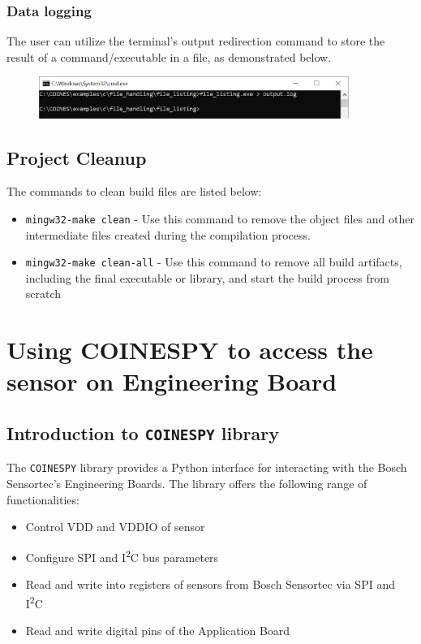 \documentclass[11pt,headings=small]{scrartcl}
\begin{document}
\subsubsection{Data logging}

The user can utilize the terminal's output redirection command to store the result of a command/executable in a file, as demonstrated below.
\begin{figure}[H]
	\begin{center}
		\includegraphics[width=0.9\textwidth]{coinesAPI_images/PC_data_logging.png}
	\end{center}
\end{figure}

\subsection{Project Cleanup}
The commands to clean build files are listed below:
\begin{itemize}
	\item \texttt{mingw32-make clean} - Use this command to remove the object files and other intermediate files created during the compilation process.
	\item \texttt{mingw32-make clean-all} - Use this command to remove all build artifacts, including the final executable or library, and start the build process from scratch
\end{itemize}

\section{Using COINESPY to access the sensor on Engineering Board}

\subsection{Introduction to \texttt{COINESPY} library}

The \texttt{COINESPY} library provides a Python interface for interacting with the Bosch Sensortec's Engineering Boards. 
\newline \newline The library offers the following range of functionalities:
\begin{itemize}
	\item Control VDD and VDDIO of sensor
	\item Configure SPI and I\textsuperscript{2}C bus parameters
	\item Read and write into registers of sensors from Bosch Sensortec via SPI and I\textsuperscript{2}C
	\item Read and write digital pins of the Application Board
\end{itemize}
\end{document}
